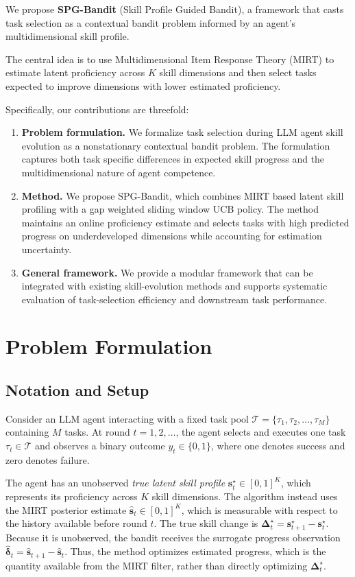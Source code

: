 \documentclass{article} %
\begin{document}
We propose \textbf{SPG-Bandit} (Skill Profile Guided Bandit), a framework that casts task selection as a contextual bandit problem informed by an agent's multidimensional skill profile.

The central idea is to use Multidimensional Item Response Theory (MIRT) to estimate latent proficiency across \(K\) skill dimensions and then select tasks expected to improve dimensions with lower estimated proficiency.

Specifically, our contributions are threefold:
\begin{enumerate}
    \item \textbf{Problem formulation.} We formalize task selection during LLM agent skill evolution as a nonstationary contextual bandit problem. The formulation captures both task specific differences in expected skill progress and the multidimensional nature of agent competence.
    \item \textbf{Method.} We propose SPG-Bandit, which combines MIRT based latent skill profiling with a gap weighted sliding window UCB policy. The method maintains an online proficiency estimate and selects tasks with high predicted progress on underdeveloped dimensions while accounting for estimation uncertainty.
    \item \textbf{General framework.} We provide a modular framework that can be integrated with existing skill-evolution methods and supports systematic evaluation of task-selection efficiency and downstream task performance.
\end{enumerate}

\section{Problem Formulation}
\label{sec:problem}

\subsection{Notation and Setup}

Consider an LLM agent interacting with a fixed task pool \(\mathcal{T} = \{\tau_1, \tau_2, \dots, \tau_M\}\) containing \(M\) tasks. At round \(t=1,2,\dots\), the agent selects and executes one task \(\tau_t\in\mathcal{T}\) and observes a binary outcome \(y_t\in\{0,1\}\), where one denotes success and zero denotes failure.

The agent has an unobserved \emph{true latent skill profile} \(\mathbf{s}_t^\star\in[0,1]^K\), which represents its proficiency across \(K\) skill dimensions. The algorithm instead uses the MIRT posterior estimate \(\widehat{\mathbf{s}}_t\in[0,1]^K\), which is measurable with respect to the history available before round \(t\). The true skill change is \(\boldsymbol{\Delta}_t^\star=\mathbf{s}_{t+1}^\star-\mathbf{s}_t^\star\). Because it is unobserved, the bandit receives the surrogate progress observation \(\widehat{\boldsymbol{\delta}}_t=\widehat{\mathbf{s}}_{t+1}-\widehat{\mathbf{s}}_t\). Thus, the method optimizes estimated progress, which is the quantity available from the MIRT filter, rather than directly optimizing \(\boldsymbol{\Delta}_t^\star\).
\end{document}
